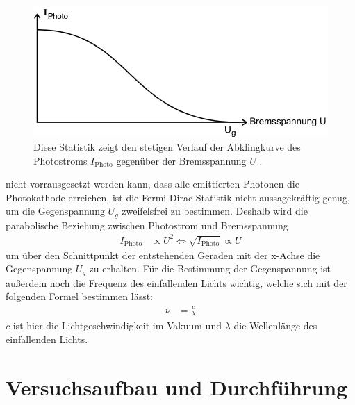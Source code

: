     \begin{figure}[H]
        \centering
        \includegraphics[width=\textwidth]{images/Dirac.jpg}
        \caption{Diese Statistik zeigt den stetigen Verlauf der Abklingkurve des Photostroms $I_{\text{Photo}}$ gegenüber der Bremsspannung $U$ \cite{V500}.}
        \label{fig:4}
    \end{figure}
    \justifying nicht vorrausgesetzt werden kann, dass alle emittierten Photonen die Photokathode erreichen, ist die Fermi-Dirac-Statistik nicht aussagekräftig genug, 
    um die Gegenspannung $U_g$ zweifelsfrei zu bestimmen. Deshalb wird die parabolische Beziehung zwischen Photostrom und Bremsspannung \cite{V500}
    \begin{align}
        I_{\text{Photo}} &\propto U^2 \Leftrightarrow \sqrt{I_{\text{Photo}}} \propto U \label{eq:4}
    \end{align}
    \justifying um über den Schnittpunkt der entstehenden Geraden mit der x-Achse die Gegenspannung $U_g$ zu erhalten. Für die Bestimmung der Gegenspannung
    ist außerdem noch die Frequenz des einfallenden Lichts wichtig, welche sich mit der folgenden Formel bestimmen lässt:
    \begin{align}
        \nu &= \frac{c}{\lambda} \label{eq:5}
    \end{align}
    $c$ ist hier die Lichtgeschwindigkeit im Vakuum und $\lambda$ die Wellenlänge des einfallenden Lichts.

\newpage
\section{Versuchsaufbau und Durchführung}


